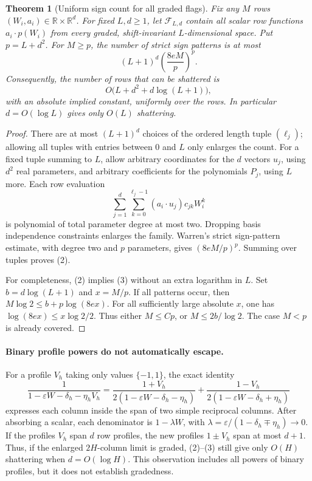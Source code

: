 \documentclass[11pt]{article}
\newtheorem{theorem}{Theorem}
\begin{document}
\begin{theorem}[Uniform sign count for all graded flags]
Fix any $M$ rows $(W_i,a_i)\in\mathbb R\times\mathbb R^d$.
For fixed $L,d\geq1$, let $\mathcal F_{L,d}$ contain all scalar row
functions $a_i\cdot p(W_i)$ from every graded, shift-invariant
$L$-dimensional space. Put $p=L+d^2$.
For $M\geq p$, the number of strict sign patterns is at most
\[
           (L+1)^d\left(\frac{8eM}{p}\right)^p.
           \tag{2}
\]
Consequently, the number of rows that can be shattered is
\[
                O\bigl(L+d^2+d\log(L+1)\bigr),
                \tag{3}
\]
with an absolute implied constant, uniformly over the rows.
In particular $d=O(\log L)$ gives only $O(L)$ shattering.
\end{theorem}
\begin{proof}
There are at most $(L+1)^d$ choices of the ordered length tuple
$(\ell_j)$; allowing all tuples with entries between $0$ and $L$
only enlarges the count. For a fixed tuple summing to $L$, allow
arbitrary coordinates for the $d$ vectors $u_j$, using $d^2$ real
parameters, and arbitrary coefficients for the polynomials $P_j$,
using $L$ more. Each row evaluation
\[
       \sum_{j=1}^d\sum_{k=0}^{\ell_j-1}
              (a_i\cdot u_j)c_{jk}W_i^k
\]
is polynomial of total parameter degree at most two. Dropping basis
independence constraints enlarges the family. Warren's strict
sign-pattern estimate, with degree two and $p$ parameters, gives
$(8eM/p)^p$. Summing over tuples proves (2).

For completeness, (2) implies (3) without an extra logarithm in $L$.
Set $b=d\log(L+1)$ and $x=M/p$. If all patterns occur, then
$M\log2\leq b+p\log(8ex)$.
For all sufficiently large absolute $x$, one has
$\log(8ex)\leq x\log2/2$. Thus either $M\leq Cp$, or
$M\leq2b/\log2$. The case $M<p$ is already covered.
\end{proof}

\paragraph{Binary profile powers do not automatically escape.}
For a profile $V_h$ taking only values $\{-1,1\}$, the exact identity
\[
 \frac1{1-\varepsilon W-\delta_h-\eta_hV_h}
 =\frac{1+V_h}{2(1-\varepsilon W-\delta_h-\eta_h)}
  +\frac{1-V_h}{2(1-\varepsilon W-\delta_h+\eta_h)}
 \tag{4}
\]
expresses each column inside the span of two simple reciprocal
columns. After absorbing a scalar, each denominator is
$1-\lambda W$, with
$\lambda=\varepsilon/(1-\delta_h\mp\eta_h)\to0$.
If the profiles $V_h$ span $d$ row profiles, the new profiles
$1\pm V_h$ span at most $d+1$. Thus, if the enlarged $2H$-column
limit is graded, (2)--(3) still give only $O(H)$ shattering when
$d=O(\log H)$. This observation includes all powers of binary
profiles, but it does not establish gradedness.
\end{document}
